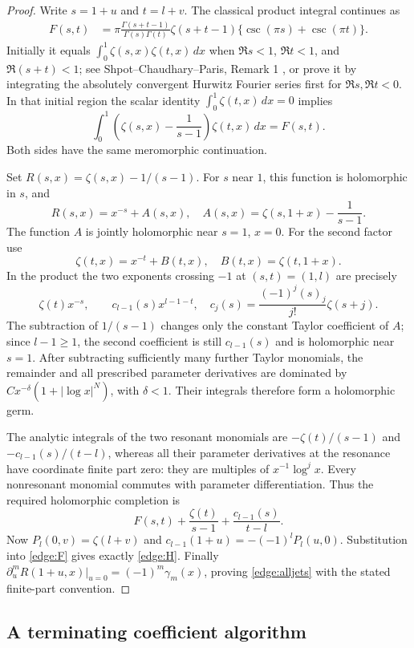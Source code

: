 \documentclass[11pt,letterpaper]{article}
\numberwithin{equation}{section}
\theoremstyle{definition}
\theoremstyle{remark}
\begin{document}
\begin{proof}
Write $s=1+u$ and $t=l+v$.  The classical product integral continues as
\begin{align}
 F(s,t)&=\pi\frac{\Gamma(s+t-1)}{\Gamma(s)\Gamma(t)}
              \zeta(s+t-1)\{\csc(\pi s)+\csc(\pi t)\}.
 \label{edge:F}
\end{align}
Initially it equals $\int_0^1\zeta(s,x)\zeta(t,x)\,dx$ when
$\Re s<1$, $\Re t<1$, and $\Re(s+t)<1$; see
Shpot--Chaudhary--Paris, Remark 1 \cite{ShpotParis}, or prove it by integrating the
absolutely convergent Hurwitz Fourier series first for
$\Re s,\Re t<0$.  In that initial region the scalar identity
$\int_0^1\zeta(t,x)\,dx=0$ implies
\[
 \int_0^1\left(\zeta(s,x)-\frac1{s-1}\right)\zeta(t,x)\,dx
 =F(s,t).
\]
Both sides have the same meromorphic continuation.

Set $R(s,x)=\zeta(s,x)-1/(s-1)$.  For $s$ near $1$, this function
is holomorphic in $s$, and
\[
 R(s,x)=x^{-s}+A(s,x),\quad
 A(s,x)=\zeta(s,1+x)-\frac1{s-1}.
\]
The function $A$ is jointly holomorphic near $s=1$, $x=0$.
For the second factor use
\[
 \zeta(t,x)=x^{-t}+B(t,x),\quad B(t,x)=\zeta(t,1+x).
\]
In the product the two exponents crossing $-1$ at $(s,t)=(1,l)$ are
precisely
\[
 \zeta(t)x^{-s},\qquad
 c_{l-1}(s)x^{l-1-t},\quad
 c_j(s)=\frac{(-1)^j(s)_j}{j!}\zeta(s+j).
\]
The subtraction of $1/(s-1)$ changes only the constant Taylor
coefficient of $A$; since $l-1\ge1$, the second coefficient is still
$c_{l-1}(s)$ and is holomorphic near $s=1$.
After subtracting sufficiently many further Taylor monomials, the
remainder and all prescribed parameter derivatives are dominated by
$Cx^{-\delta}(1+|\log x|^N)$, with $\delta<1$.
Their integrals therefore form a holomorphic germ.

The analytic integrals of the two resonant monomials are
$-\zeta(t)/(s-1)$ and $-c_{l-1}(s)/(t-l)$, whereas all their
parameter derivatives at the resonance have coordinate finite part
zero: they are multiples of $x^{-1}\log^j x$.
Every nonresonant monomial commutes with parameter differentiation.
Thus the required holomorphic completion is
\[
 F(s,t)+\frac{\zeta(t)}{s-1}+
                         \frac{c_{l-1}(s)}{t-l}.
\]
Now $P_l(0,v)=\zeta(l+v)$ and
$c_{l-1}(1+u)=-(-1)^lP_l(u,0)$.
Substitution into \eqref{edge:F} gives exactly \eqref{edge:H}.
Finally $\partial_u^mR(1+u,x)|_{u=0}=(-1)^m\gamma_m(x)$,
proving \eqref{edge:alljets} with the stated finite-part convention.
\end{proof}

\subsection{A terminating coefficient algorithm}
\end{document}

